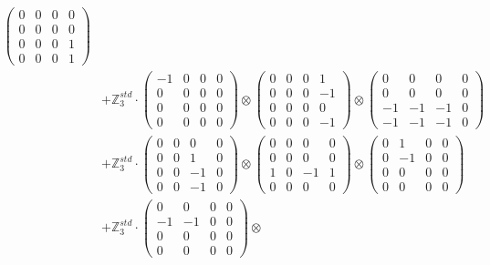 \documentclass{article}
\begin{document}
{\begin{align}
            \begin{pmatrix} 0 & 0 & 0 & 0 \\ 0 & 0 & 0 & 0 \\ 0 & 0 & 0 & 1 \\ 0 & 0 & 0 & 1 \end{pmatrix} \\ 
        &+ \label{Rs1-Rc16-Solution-4-c7} \mathbb{Z}_3^{std} \cdot 
            \begin{pmatrix} -1 & 0 & 0 & 0 \\ 0 & 0 & 0 & 0 \\ 0 & 0 & 0 & 0 \\ 0 & 0 & 0 & 0 \end{pmatrix} \otimes 
            \begin{pmatrix} 0 & 0 & 0 & 1 \\ 0 & 0 & 0 & -1 \\ 0 & 0 & 0 & 0 \\ 0 & 0 & 0 & -1 \end{pmatrix} \otimes 
            \begin{pmatrix} 0 & 0 & 0 & 0 \\ 0 & 0 & 0 & 0 \\ -1 & -1 & -1 & 0 \\ -1 & -1 & -1 & 0 \end{pmatrix} \\ 
        &+ \label{Rs1-Rc16-Solution-4-c8} \mathbb{Z}_3^{std} \cdot 
            \begin{pmatrix} 0 & 0 & 0 & 0 \\ 0 & 0 & 1 & 0 \\ 0 & 0 & -1 & 0 \\ 0 & 0 & -1 & 0 \end{pmatrix} \otimes 
            \begin{pmatrix} 0 & 0 & 0 & 0 \\ 0 & 0 & 0 & 0 \\ 1 & 0 & -1 & 1 \\ 0 & 0 & 0 & 0 \end{pmatrix} \otimes 
            \begin{pmatrix} 0 & 1 & 0 & 0 \\ 0 & -1 & 0 & 0 \\ 0 & 0 & 0 & 0 \\ 0 & 0 & 0 & 0 \end{pmatrix} \\ 
        &+ \label{Rs1-Rc16-Solution-4-c9} \mathbb{Z}_3^{std} \cdot 
            \begin{pmatrix} 0 & 0 & 0 & 0 \\ -1 & -1 & 0 & 0 \\ 0 & 0 & 0 & 0 \\ 0 & 0 & 0 & 0 \end{pmatrix} \otimes 

\end{align}}
\end{document}
